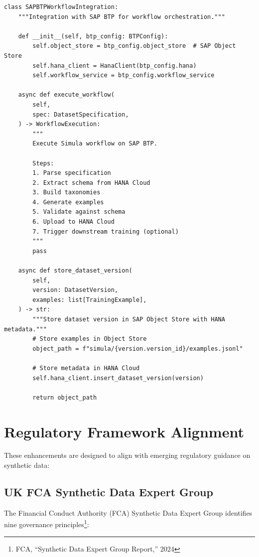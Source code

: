 \begin{lstlisting}[language=jsonx,caption={SAP BTP integration for workflow orchestration.}]
class SAPBTPWorkflowIntegration:
    """Integration with SAP BTP for workflow orchestration."""
    
    def __init__(self, btp_config: BTPConfig):
        self.object_store = btp_config.object_store  # SAP Object Store
        self.hana_client = HanaClient(btp_config.hana)
        self.workflow_service = btp_config.workflow_service
    
    async def execute_workflow(
        self,
        spec: DatasetSpecification,
    ) -> WorkflowExecution:
        """
        Execute Simula workflow on SAP BTP.
        
        Steps:
        1. Parse specification
        2. Extract schema from HANA Cloud
        3. Build taxonomies
        4. Generate examples
        5. Validate against schema
        6. Upload to HANA Cloud
        7. Trigger downstream training (optional)
        """
        pass
    
    async def store_dataset_version(
        self,
        version: DatasetVersion,
        examples: list[TrainingExample],
    ) -> str:
        """Store dataset version in SAP Object Store with HANA metadata."""
        # Store examples in Object Store
        object_path = f"simula/{version.version_id}/examples.jsonl"
        
        # Store metadata in HANA Cloud
        self.hana_client.insert_dataset_version(version)
        
        return object_path
\end{lstlisting}


\section{Regulatory Framework Alignment}

These enhancements are designed to align with emerging regulatory guidance on
synthetic data:

\subsection{UK FCA Synthetic Data Expert Group}

The Financial Conduct Authority (FCA) Synthetic Data Expert Group identifies
nine governance principles\footnote{FCA, ``Synthetic Data Expert Group Report,'' 2024}:

